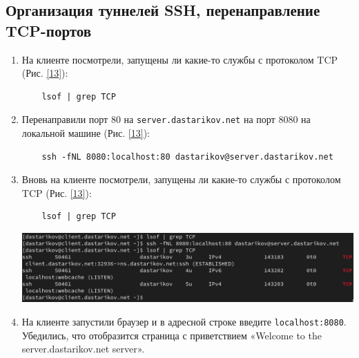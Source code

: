 \subsection{Организация туннелей SSH, перенаправление TCP-портов}
\begin{enumerate}
\item На клиенте посмотрели, запущены ли какие-то службы с протоколом TCP (Рис. \ref{13}):
  \begin{verbatim}
    lsof | grep TCP
  \end{verbatim}
\item Перенаправили порт 80 на \texttt{server.dastarikov.net} на порт 8080 на локальной машине (Рис. \ref{13}):
  \begin{verbatim}
    ssh -fNL 8080:localhost:80 dastarikov@server.dastarikov.net
  \end{verbatim}
\item Вновь на клиенте посмотрели, запущены ли какие-то службы с протоколом TCP (Рис. \ref{13}):
  \begin{verbatim}
    lsof | grep TCP
  \end{verbatim}
\begin{center}
  \centering
  \includegraphics[width=\textwidth]{../images/image13.png}
  \label{13}
\end{center}

\item На клиенте запустили браузер и в адресной строке введите \texttt{localhost:8080}. Убедились, что отобразится страница с 
приветствием «Welcome to the server.dastarikov.net server».
\end{enumerate}

